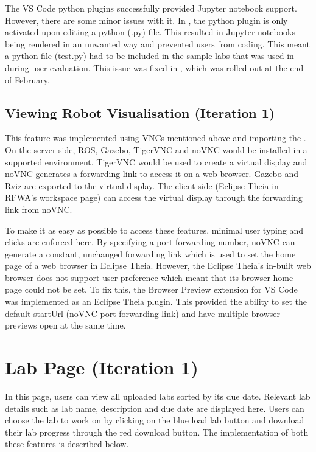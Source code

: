 \documentclass{l4proj}
\begin{document}
The VS Code python plugins successfully provided Jupyter notebook support. However, there are some minor issues with it. In \cite{theia0.15.0}, the python plugin is only activated upon editing a python (.py) file. This resulted in Jupyter notebooks being rendered in an unwanted way and prevented users from coding. This meant a python file (test.py) had to be included in the sample labs that was used in during user evaluation. This issue was fixed in \cite{theia0.16.0}, which was rolled out at the end of February. 

\subsection{Viewing Robot Visualisation (Iteration 1)}

This feature was implemented using VNCs mentioned above and importing the \cite{browserpreview}. On the server-side, ROS, Gazebo, TigerVNC and noVNC would be installed in a supported environment. TigerVNC would be used to create a virtual display and noVNC generates a forwarding link to access it on a web browser. Gazebo and Rviz are exported to the virtual display. The client-side (Eclipse Theia in RFWA's workspace page) can access the virtual display through the forwarding link from noVNC.

To make it as easy as possible to access these features, minimal user typing and clicks are enforced here. By specifying a port forwarding number, noVNC can generate a constant, unchanged forwarding link which is used to set the home page of a web browser in Eclipse Theia. However, the Eclipse Theia's in-built web browser does not support user preference which meant that its browser home page could not be set. To fix this, the Browser Preview extension for VS Code was implemented as an Eclipse Theia plugin. This provided the ability to set the default startUrl (noVNC port forwarding link) and have multiple browser previews open at the same time.

\section{Lab Page (Iteration 1)}

In this page, users can view all uploaded labs sorted by its due date. Relevant lab details such as lab name, description and due date are displayed here. Users can choose the lab to work on by clicking on the blue load lab button and download their lab progress through the red download button. The implementation of both these features is described below. 
\end{document}

